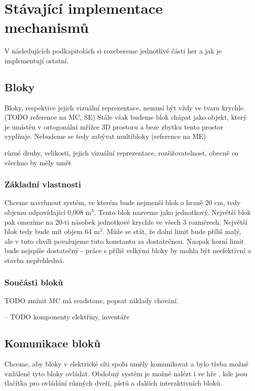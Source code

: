 

\section{Stávající implementace mechanismů}

V následujících podkapitolách si rozebereme jednotlivé části her a jak je implementují ostatní.

\subsection{Bloky}

Bloky, respektive jejich vizuální reprezentace, nemusí být vždy ve tvaru krychle.\\(TODO reference na MC, SE) Stále však budeme blok chápat jako objekt, který je umístěn v ortogonální mřížce 3D prostoru a beze zbytku tento prostor vyplňuje. Nebudeme se tedy zabývat multibloky (reference na ME)

různé druhy, velikosti, jejich vizuální reprezentace, rozšiřovatelnost, obecně co všechno by měly umět

\subsubsection{Základní vlastnosti}
Chceme navrhnout systém, ve kterém bude nejmenší blok o hraně 20 cm, tedy objemu odpovídající 0,008 m$^3$. Tento blok nazveme jako jednotkový. Největší blok pak omezíme na 20-ti násobek jednotkové krychle ve všech 3 rozměrech. Největší blok tedy bude mít objem 64 m$^3$. Může se stát, že dolní limit bude příliš malý, ale v tuto chvíli považujeme tuto konstantu za dostatečnou. Naopak horní limit bude nejspíše dostatečný - práce s příliš velkými bloky by mohla být neefektivní a stavba nepřehledná.

\subsubsection{Součásti bloků}
TODO zmínit MC má readstone, popsat základy chování.



-- TODO komponenty elektřiny, inventáře

\subsection{Komunikace bloků}

Chceme, aby bloky v elektrické síti spolu uměly komunikovat a bylo třeba možné vzdáleně tyto bloky ovládat. Obdobný systém je možné nalézt i ve hře \SE{}, kde jsou tlačítka pro ovládání různých dveří, pístů a dalších interaktivních bloků.

